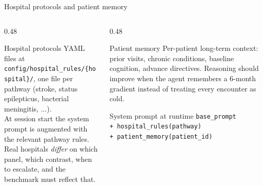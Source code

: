 \documentclass[aspectratio=169,t]{beamer}
\begin{document}
\begin{frame}{Hospital protocols and patient memory}
  \begin{columns}[T,onlytextwidth]
    \begin{column}{0.48\textwidth}
      \begin{block}{Hospital protocols}
        \footnotesize
        YAML files at \texttt{config/hospital\_rules/\{hospital\}/},
        one file per pathway (stroke, status epilepticus, bacterial
        meningitis, ...).\\[1mm]
        At session start the system prompt is augmented with the
        relevant pathway rules.\\[1mm]
        Real hospitals \emph{differ} on which panel, which contrast,
        when to escalate, and the benchmark must reflect that.
      \end{block}
    \end{column}%
    \hfill
    \begin{column}{0.48\textwidth}
      \begin{exampleblock}{Patient memory}
        \footnotesize
        Per-patient long-term context: prior visits, chronic
        conditions, baseline cognition, advance directives.
        Reasoning should improve when the agent remembers a 6-month
        gradient instead of treating every encounter as cold.
      \end{exampleblock}
      \begin{alertblock}{System prompt at runtime}
        \scriptsize
        \texttt{base\_prompt}\\
        \quad\texttt{+ hospital\_rules(pathway)}\\
        \quad\texttt{+ patient\_memory(patient\_id)}
      \end{alertblock}
    \end{column}
  \end{columns}
\end{frame}
\end{document}
